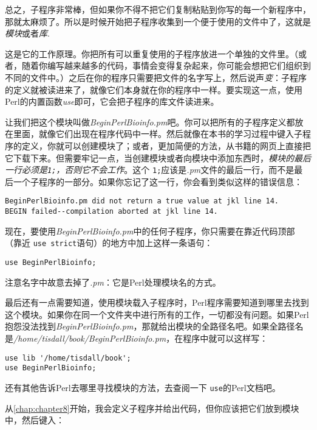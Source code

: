 总之，子程序非常棒，但如果你不得不把它们复制粘贴到你写的每一个新程序中，那就太麻烦了。所以是时候开始把子程序收集到一个便于使用的文件中了，这就是\textit{模块}或者\textit{库}.

这是它的工作原理。你把所有可以重复使用的子程序放进一个单独的文件里。（或者，随着你编写越来越多的代码，事情会变得复杂起来，你可能会想把它们组织到不同的文件中。）之后在你的程序只需要把文件的名字写上，然后说声\textit{变}：子程序的定义就被读进来了，就像它们本身就在你的程序中一样。要实现这一点，使用Perl的内置函数\textit{use}即可，它会把子程序的库文件读进来。

让我们把这个模块叫做\textit{BeginPerlBioinfo.pm}吧。你可以把所有的子程序定义都放在里面，就像它们出现在程序代码中一样。然后就像在本书的学习过程中键入子程序的定义，你就可以创建模块了；或者，更加简便的方法，从书籍的网页上直接把它下载下来。但需要牢记一点，当创建模块或者向模块中添加东西时，\textit{模块的最后一行必须是\texttt{1;}，否则它不会工作}。这个 \verb|1;|应该是\textit{.pm}文件的最后一行，而不是最后一个子程序的一部分。如果你忘记了这一行，你会看到类似这样的错误信息：

\begin{lstlisting}
BeginPerlBioinfo.pm did not return a true value at jkl line 14.
BEGIN failed--compilation aborted at jkl line 14.
\end{lstlisting}

现在，要使用\textit{BeginPerlBioinfo.pm}中的任何子程序，你只需要在靠近代码顶部（靠近 \verb|use strict|语句）的地方中加上这样一条语句：

\begin{lstlisting}
use BeginPerlBioinfo;
\end{lstlisting}

注意名字中故意去掉了\textit{.pm}：它是Perl处理模块名的方式。

最后还有一点需要知道，使用模块载入子程序时，Perl程序需要知道到哪里去找到这个模块。如果你在同一个文件夹中进行所有的工作，一切都没有问题。如果Perl抱怨没法找到\textit{BeginPerlBioinfo.pm}，那就给出模块的全路径名吧。如果全路径名是\textit{/home/tisdall/book/BeginPerlBioinfo.pm}，在程序中就可以这样写：

\begin{lstlisting}
use lib '/home/tisdall/book';
use BeginPerlBioinfo;
\end{lstlisting}

还有其他告诉Perl去哪里寻找模块的方法，去查阅一下 \verb|use|的Perl文档吧。

从\autoref{chap:chapter8}开始，我会定义子程序并给出代码，但你应该把它们放到模块中，然后键入：

